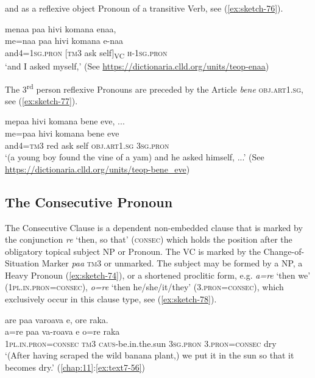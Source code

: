 \documentclass[output=paper]{langscibook}
\begin{document}
\noindent and as a reflexive object Pronoun of a transitive Verb, see (\ref{ex:sketch-76}).

\ea\label{ex:sketch-76}
    menaa paa hivi komana enaa,\\
    \gll me=naa paa hivi komana e-naa\\
    and4=1\textsc{sg}.\textsc{pron} [\textsc{tm}3 ask self]\textsubscript{VC} \textsc{h}-1\textsc{sg}.\textsc{pron}\\
    \glt `and I asked myself,' (See \url{https://dictionaria.clld.org/units/teop-enaa})
\z

The 3\textsuperscript{rd} person reflexive Pronouns are preceded by the Article \textit{bene} \textsc{obj}.\textsc{art}1.\textsc{sg}, see (\ref{ex:sketch-77}).

\ea\label{ex:sketch-77}
    mepaa hivi komana bene eve, ...\\
    \gll me=paa hivi komana bene eve\\
    and4=\textsc{tm}3 red ask self \textsc{obj}.\textsc{art}1.\textsc{sg} 3\textsc{sg}.\textsc{pron}\\
    \glt `(a young boy found the vine of a yam) and he asked himself, ...' (See \url{https://dictionaria.clld.org/units/teop-bene\_eve})
\z

\subsection{The Consecutive Pronoun}\label{sec:consecpron}

The Consecutive Clause is a dependent non-embedded clause that is marked by the conjunction \textit{re} `then, so that' (\textsc{consec}) which holds the position after the obligatory topical subject NP or Pronoun. The VC is marked by the Change-of-Situation Marker \textit{paa} \textsc{tm}3 or unmarked. The subject may be formed by a NP, a Heavy Pronoun (\ref{ex:sketch-74}), or a shortened proclitic form, e.g.  \textit{a=re} `then we' (1\textsc{pl}.\textsc{in}.\textsc{pron}=\textsc{consec}), \textit{o=re} `then he/she/it/they' (3.\textsc{pron}=\textsc{consec}), which exclusively occur in this clause type, see (\ref{ex:sketch-78}). 

\ea\label{ex:sketch-78}
    are paa varoava e, ore raka.\\
    \gll a=re	paa	va-roava	e	o=re	raka\\
    1\textsc{pl}.\textsc{in}.\textsc{pron}=\textsc{consec}	\textsc{tm}3	\textsc{caus}-be.in.the.sun	3\textsc{sg}.\textsc{pron}	3.\textsc{pron}=\textsc{consec}	dry\\
    \glt `(After having scraped the wild banana plant,) we put it in the sun so that it becomes dry.' (\ref{chap:11}:\ref{ex:text7-56})
\z
\end{document}
